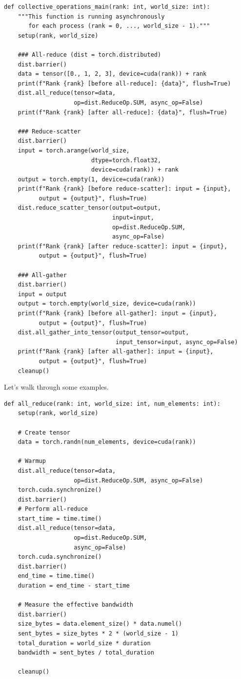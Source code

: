 \documentclass[12pt,twoside]{article}
\begin{document}
\begin{verbatim}
def collective_operations_main(rank: int, world_size: int):  
    """This function is running asynchronously 
       for each process (rank = 0, ..., world_size - 1)."""
    setup(rank, world_size)
    
    ### All-reduce (dist = torch.distributed)
    dist.barrier() 
    data = tensor([0., 1, 2, 3], device=cuda(rank)) + rank
    print(f"Rank {rank} [before all-reduce]: {data}", flush=True)
    dist.all_reduce(tensor=data, 
                    op=dist.ReduceOp.SUM, async_op=False) 
    print(f"Rank {rank} [after all-reduce]: {data}", flush=True)
    
    ### Reduce-scatter
    dist.barrier()
    input = torch.arange(world_size, 
                         dtype=torch.float32, 
                         device=cuda(rank)) + rank
    output = torch.empty(1, device=cuda(rank))
    print(f"Rank {rank} [before reduce-scatter]: input = {input}, 
          output = {output}", flush=True)
    dist.reduce_scatter_tensor(output=output, 
                               input=input, 
                               op=dist.ReduceOp.SUM, 
                               async_op=False)
    print(f"Rank {rank} [after reduce-scatter]: input = {input}, 
          output = {output}", flush=True)
    
    ### All-gather
    dist.barrier()
    input = output
    output = torch.empty(world_size, device=cuda(rank)) 
    print(f"Rank {rank} [before all-gather]: input = {input}, 
          output = {output}", flush=True)
    dist.all_gather_into_tensor(output_tensor=output, 
                                input_tensor=input, async_op=False)
    print(f"Rank {rank} [after all-gather]: input = {input}, 
          output = {output}", flush=True)
    cleanup()
\end{verbatim}

Let's walk through some examples.

\begin{verbatim}
def all_reduce(rank: int, world_size: int, num_elements: int):
    setup(rank, world_size)
    
    # Create tensor
    data = torch.randn(num_elements, device=cuda(rank))
    
    # Warmup
    dist.all_reduce(tensor=data, 
                    op=dist.ReduceOp.SUM, async_op=False)
    torch.cuda.synchronize()
    dist.barrier()
    # Perform all-reduce
    start_time = time.time()
    dist.all_reduce(tensor=data, 
                    op=dist.ReduceOp.SUM, 
                    async_op=False)
    torch.cuda.synchronize()
    dist.barrier()
    end_time = time.time()
    duration = end_time - start_time
    
    # Measure the effective bandwidth
    dist.barrier()
    size_bytes = data.element_size() * data.numel()
    sent_bytes = size_bytes * 2 * (world_size - 1)
    total_duration = world_size * duration
    bandwidth = sent_bytes / total_duration
    
    cleanup()  
\end{verbatim}
\end{document}
